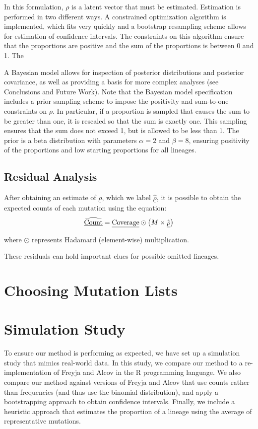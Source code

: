 \documentclass{article}
\begin{document}
In this formulation, $\rho$ is a latent vector that must be estimated.
Estimation is performed in two different ways.
A constrained optimization algorithm is implemented, which fits very quickly and a bootstrap resampling scheme allows for estimation of confidence intervals.
The constraints on this algorithm ensure that the proportions are positive and the sum of the proportions is between 0 and 1.
The 

A Bayesian model allows for inspection of posterior distributions and posterior covariance, as well as providing a basis for more complex analyses (see Conclusions and Future Work).
Note that the Bayesian model specification includes a prior sampling scheme to impose the positivity and sum-to-one constraints on $\rho$.
In particular, if a proportion is sampled that causes the sum to be greater than one, it is rescaled so that the sum is exactly one.
This sampling ensures that the sum does not exceed 1, but is allowed to be less than 1. 
The prior is a beta distribution with parameters $\alpha=2$ and $\beta=8$, ensuring positivity of the proportions and low starting proportions for all lineages.





\subsection{Residual Analysis}

After obtaining an estimate of $\underline\rho$, which we label $\hat{\underline\rho}$, it is possible to obtain the expected counts of each mutation using the equation:
$$\widehat{\text{\underline{Count}}} = \text{\underline{Coverage}}\odot\left(M\times\hat{\underline\rho}\right)$$

\noindent where $\odot$ represents Hadamard (element-wise) multiplication.

These residuals can hold important clues for possible omitted lineages.

\section{Choosing Mutation Lists}

\section{Simulation Study}

To ensure our method is performing as expected, we have set up a simulation study that mimics real-world data.
In this study, we compare our method to a re-implementation of Freyja and Alcov in the R programming language.
We also compare our method against versions of Freyja and Alcov that use counts rather than frequencies (and thus use the binomial distribution), and apply a bootstrapping approach to obtain confidence intervals.
Finally, we include a heuristic approach that estimates the proportion of a lineage using the average of representative mutations.
\end{document}
